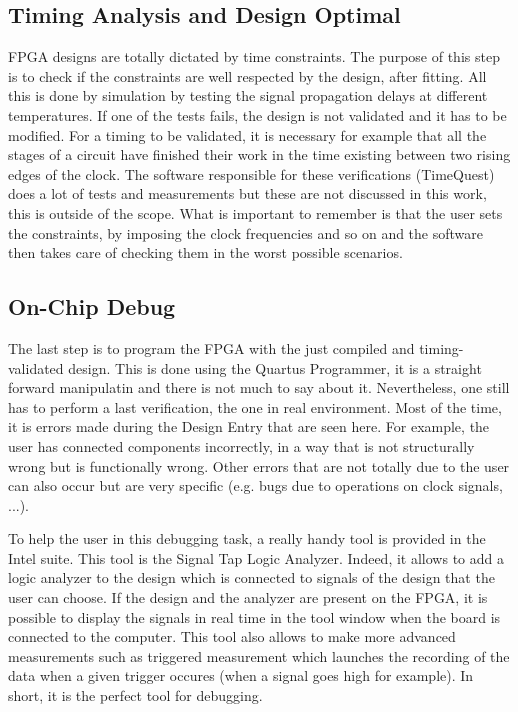 \subsection{Timing Analysis and Design Optimal}

FPGA designs are totally dictated by time constraints. The purpose of this step is to check if the 
constraints are well respected by the design, after fitting. All this is done by simulation by 
testing the signal propagation delays at different temperatures. If one of the tests fails, the 
design is not validated and it has to be modified. For a timing to be validated, it is 
necessary for example that all the stages of a circuit have finished their work in the time existing 
between two rising edges of the clock. The software responsible for these verifications (TimeQuest) 
does a lot of tests and measurements but these are not discussed in this work, this is outside of the 
scope. What is important to remember is that the user sets the constraints, by imposing the clock 
frequencies and so on and the software then takes care of checking them in the worst possible 
scenarios. 

\subsection{On-Chip Debug}

The last step is to program the FPGA with the just compiled and timing-validated design. This is done
using the Quartus Programmer, it is a straight forward manipulatin and there is not much to say
about it. Nevertheless, one still has to perform a last verification, the one in real environment. 
Most of the time, it is errors made during the Design Entry that are seen here. For 
example, the user has connected components incorrectly, in a way that is not structurally 
wrong but is functionally wrong. Other errors that are not totally due to the user can also occur 
but are very specific (e.g. bugs due to operations on clock signals, ...).

To help the user in this debugging task, a really handy tool is provided in the Intel suite. This 
tool is the Signal Tap Logic Analyzer. Indeed, it allows to add a logic analyzer to the design 
which is connected to signals of the design that the user can choose. If the design and the 
analyzer are present on the FPGA, it is possible to display the signals in real time in the tool 
window when the board is connected to the computer. This tool also allows to make more advanced 
measurements such as triggered measurement which launches the recording of the data when a given
trigger occures (when a signal goes high for example). In short, it is the perfect tool for debugging.